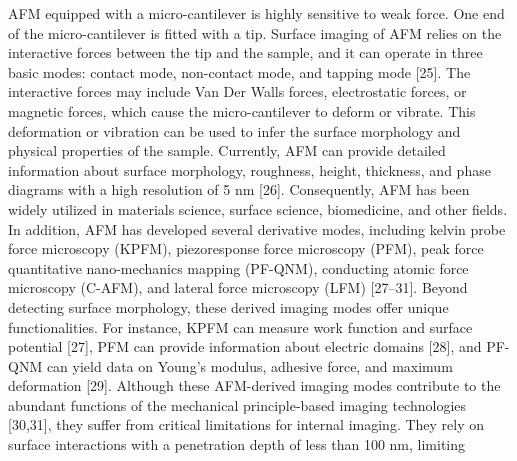 \documentclass[11pt]{article}
\begin{document}
AFM equipped with a micro-cantilever is highly sensitive to weak
force. One end of the micro-cantilever is fitted with a tip. Surface
imaging of AFM relies on the interactive forces between the tip and
the sample, and it can operate in three basic modes: contact mode,
non-contact mode, and tapping mode [25]. The interactive forces may
include Van Der Walls forces, electrostatic forces, or magnetic
forces, which cause the micro-cantilever to deform or vibrate. This
deformation or vibration can be used to infer the surface morphology
and physical properties of the sample. Currently, AFM can provide
detailed information about surface morphology, roughness, height,
thickness, and phase diagrams with a high resolution of 5 nm [26].
Consequently, AFM has been widely utilized in materials science,
surface science, biomedicine, and other fields. In addition, AFM has
developed several derivative modes, including kelvin probe force
microscopy (KPFM), piezoresponse force microscopy (PFM), peak force
quantitative nano-mechanics mapping (PF-QNM), conducting atomic
force microscopy (C-AFM), and lateral force microscopy (LFM)
[27--31]. Beyond detecting surface morphology, these derived imaging
modes offer unique functionalities. For instance, KPFM can measure
work function and surface potential [27], PFM can provide
information about electric domains [28], and PF-QNM can yield data
on Young's modulus, adhesive force, and maximum deformation [29].
Although these AFM-derived imaging modes contribute to the abundant
functions of the mechanical principle-based imaging technologies
[30,31], they suffer from critical limitations for internal imaging.
They rely on surface interactions with a penetration depth of less
than 100 nm, limiting

\vspace{0.8em}

\begin{center}
\end{center}
\end{document}

